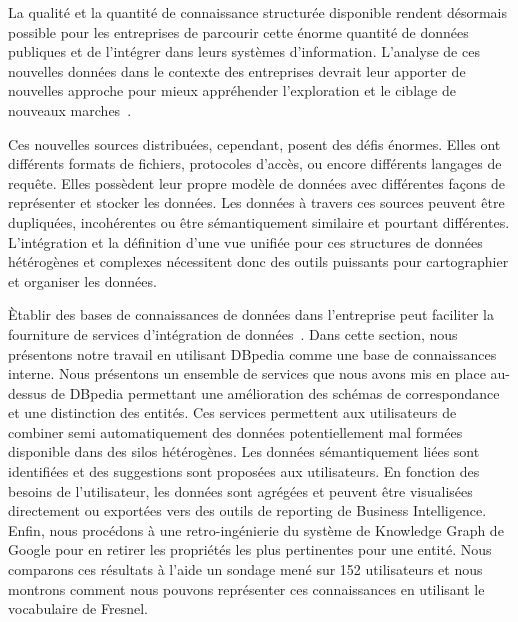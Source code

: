 La qualit\'{e} et la quantit\'{e} de connaissance structur\'{e}e disponible rendent d\'{e}sormais possible pour les entreprises de parcourir cette \'{e}norme quantit\'{e} de donn\'{e}es publiques et de l'int\'{e}grer dans leurs syst\`{e}mes d'information. L'analyse de ces nouvelles donn\'{e}es dans le contexte des entreprises devrait leur apporter de nouvelles approche pour mieux appr\'{e}hender l'exploration et le ciblage de nouveaux marches~\cite{LaValle:MIT:11}.

Ces nouvelles sources distribu\'{e}es, cependant, posent des d\'{e}fis \'{e}normes. Elles ont diff\'{e}rents formats de fichiers, protocoles d'acc\`{e}s, ou encore diff\'{e}rents langages de requ\^{e}te. Elles poss\`{e}dent leur propre mod\`{e}le de donn\'{e}es avec diff\'{e}rentes façons de repr\'{e}senter et stocker les donn\'{e}es. Les donn\'{e}es \`{a} travers ces sources peuvent \^{e}tre dupliqu\'{e}es, incoh\'{e}rentes ou \^{e}tre s\'{e}mantiquement similaire et pourtant diff\'{e}rentes. L'int\'{e}gration et la d\'{e}finition d'une vue unifi\'{e}e pour ces structures de donn\'{e}es h\'{e}t\'{e}rog\`{e}nes et complexes n\'{e}cessitent donc des outils puissants pour cartographier et organiser les donn\'{e}es.

\`{E}tablir des bases de connaissances de donn\'{e}es dans l'entreprise peut faciliter la fourniture de services d'int\'{e}gration de donn\'{e}es~\cite{Frischmuth:SemWebJorunal:12}. Dans cette section, nous pr\'{e}sentons notre travail en utilisant DBpedia comme une base de connaissances interne. Nous pr\'{e}sentons un ensemble de services que nous avons mis en place au-dessus de DBpedia permettant une am\'{e}lioration des sch\'{e}mas de correspondance et une distinction des entit\'{e}s. Ces services permettent aux utilisateurs de combiner semi automatiquement des donn\'{e}es potentiellement mal form\'{e}es disponible dans des silos h\'{e}t\'{e}rog\`{e}nes. Les donn\'{e}es s\'{e}mantiquement li\'{e}es sont identifi\'{e}es et des suggestions sont propos\'{e}es aux utilisateurs. En fonction des besoins de l'utilisateur, les donn\'{e}es sont agr\'{e}g\'{e}es et peuvent \^{e}tre visualis\'{e}es directement ou export\'{e}es vers des outils de reporting de Business Intelligence. Enfin, nous proc\'{e}dons \`{a} une retro-ing\'{e}nierie du syst\`{e}me de Knowledge Graph de Google pour en retirer les propri\'{e}t\'{e}s les plus pertinentes pour une entit\'{e}. Nous comparons ces r\'{e}sultats \`{a} l'aide un sondage men\'{e} sur 152 utilisateurs et nous montrons comment nous pouvons repr\'{e}senter ces connaissances en utilisant le vocabulaire de Fresnel.

